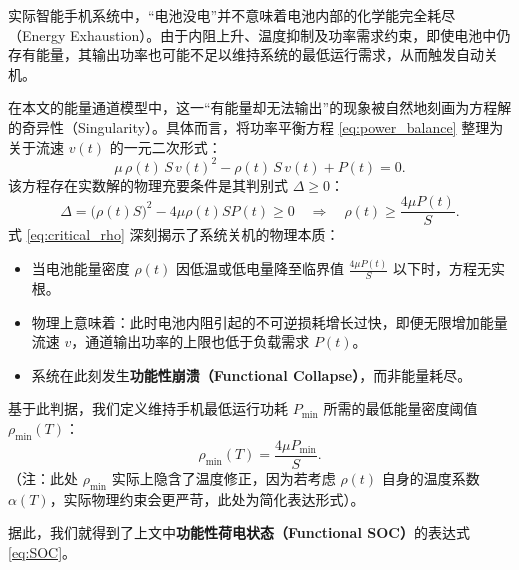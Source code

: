 \documentclass[11pt]{article}
\begin{document}
实际智能手机系统中，“电池没电”并不意味着电池内部的化学能完全耗尽（Energy Exhaustion）。由于内阻上升、温度抑制及功率需求约束，即使电池中仍存有能量，其输出功率也可能不足以维持系统的最低运行需求，从而触发自动关机。

在本文的能量通道模型中，这一“有能量却无法输出”的现象被自然地刻画为方程解的奇异性（Singularity）。具体而言，将功率平衡方程 \eqref{eq:power_balance} 整理为关于流速 $v(t)$ 的一元二次形式：
\begin{equation}
  \mu\,\rho(t)\,S\,v(t)^2 - \rho(t)\,S\,v(t) + P(t) = 0.
\end{equation}
该方程存在实数解的物理充要条件是其判别式 $\Delta \ge 0$：
\begin{equation}
  \Delta = \bigl(\rho(t) S\bigr)^2 - 4\mu\rho(t)S P(t) \ge 0 \quad \Longrightarrow \quad \rho(t) \ge \frac{4\mu P(t)}{S}. \label{eq:critical_rho}
\end{equation}
式 \eqref{eq:critical_rho} 深刻揭示了系统关机的物理本质：
\begin{itemize}
    \item 当电池能量密度 $\rho(t)$ 因低温或低电量降至临界值 $\frac{4\mu P(t)}{S}$ 以下时，方程无实根。
    \item 物理上意味着：此时电池内阻引起的不可逆损耗增长过快，即便无限增加能量流速 $v$，通道输出功率的上限也低于负载需求 $P(t)$。
    \item 系统在此刻发生\textbf{功能性崩溃（Functional Collapse）}，而非能量耗尽。
\end{itemize}

基于此判据，我们定义维持手机最低运行功耗 $P_{\min}$ 所需的最低能量密度阈值 $\rho_{\min}(T)$：
\begin{equation}
  \rho_{\min}(T) = \frac{4\mu P_{\min}}{S}.
\end{equation}
（注：此处 $\rho_{\min}$ 实际上隐含了温度修正，因为若考虑 $\rho(t)$ 自身的温度系数 $\alpha(T)$，实际物理约束会更严苛，此处为简化表达形式）。

据此，我们就得到了上文中\textbf{功能性荷电状态（Functional SOC）}的表达式\ref{eq:SOC}。
\end{document}
